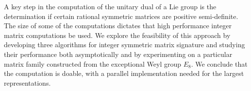 A key step in the computation of the unitary dual of a Lie group is
the determination if certain rational symmetric matrices are positive
semi-definite. The size of some of the computations dictates that high
performance integer matrix computations be used.  We explore the
feasibility of this approach by developing three algorithms for
integer symmetric matrix signature and studying their performance both
asymptotically and by experimenting on a particular matrix family
constructed from the exceptional Weyl group $E_8$.  We conclude that the
computation is doable, with a parallel implementation needed for the
largest representations.

